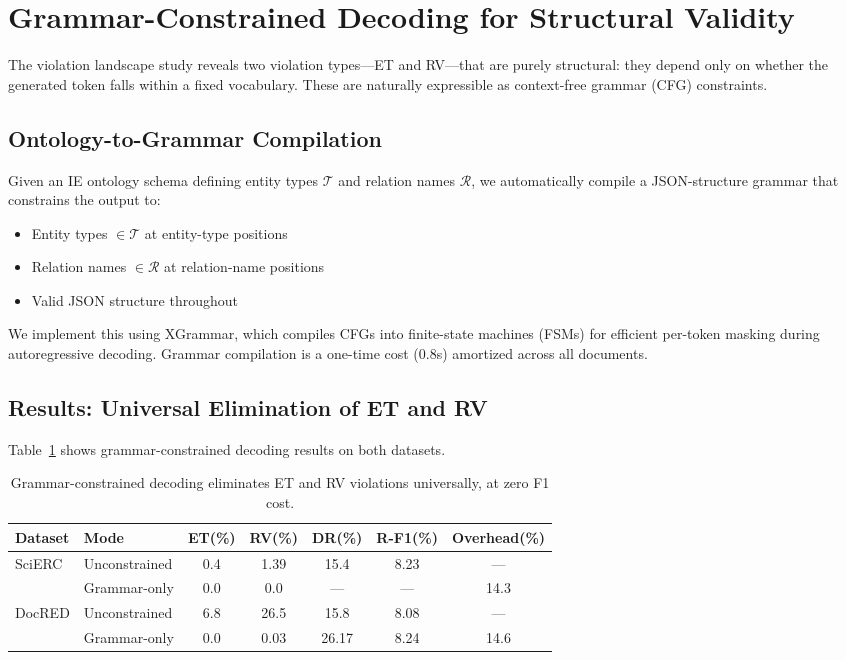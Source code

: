 \documentclass[11pt,a4paper]{article}
\begin{document}
\section{Grammar-Constrained Decoding for Structural Validity}
\label{sec:grammar}

The violation landscape study reveals two violation types---ET and RV---that are purely structural: they depend only on whether the generated token falls within a fixed vocabulary.
These are naturally expressible as context-free grammar (CFG) constraints.

\subsection{Ontology-to-Grammar Compilation}

Given an IE ontology schema defining entity types $\mathcal{T}$ and relation names $\mathcal{R}$, we automatically compile a JSON-structure grammar that constrains the output to:
\begin{itemize}
\item Entity types $\in \mathcal{T}$ at entity-type positions
\item Relation names $\in \mathcal{R}$ at relation-name positions
\item Valid JSON structure throughout
\end{itemize}

We implement this using XGrammar, which compiles CFGs into finite-state machines (FSMs) for efficient per-token masking during autoregressive decoding.
Grammar compilation is a one-time cost (0.8s) amortized across all documents.

\subsection{Results: Universal Elimination of ET and RV}

Table~\ref{tab:grammar_results} shows grammar-constrained decoding results on both datasets.

\begin{table}[t]
\centering
\caption{Grammar-constrained decoding eliminates ET and RV violations universally, at zero F1 cost.}
\label{tab:grammar_results}
\begin{tabular}{llccccc}
\toprule
\textbf{Dataset} & \textbf{Mode} & \textbf{ET(\%)} & \textbf{RV(\%)} & \textbf{DR(\%)} & \textbf{R-F1(\%)} & \textbf{Overhead(\%)} \\
\midrule
\multirow{2}{*}{SciERC}
 & Unconstrained  & 0.4  & 1.39 & 15.4  & 8.23 & --- \\
 & Grammar-only   & 0.0  & 0.0  & ---   & ---  & 14.3 \\
\midrule
\multirow{2}{*}{DocRED}
 & Unconstrained  & 6.8  & 26.5 & 15.8  & 8.08 & --- \\
 & Grammar-only   & 0.0  & 0.03 & 26.17 & 8.24 & 14.6 \\
\bottomrule
\end{tabular}
\end{table}
\end{document}

